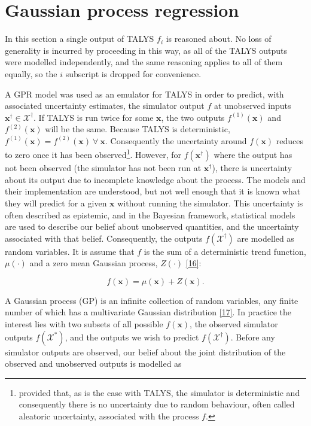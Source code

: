 \documentclass[
  12pt,
  a4paper,
  twoside]{book}
\begin{document}
\hypertarget{GPR:GPR}{%
\section{Gaussian process regression}\label{GPR:GPR}}

In this section a single output of TALYS \(f_i\) is reasoned about. No loss of generality is incurred by proceeding in this way, as all of the TALYS outputs were modelled independently, and the same reasoning applies to all of them equally, so the \(i\) subscript is dropped for convenience.

A GPR model was used as an emulator for TALYS in order to predict, with associated uncertainty estimates, the simulator output \(f\) at unobserved inputs \(\mathbf{x}^\dagger \in \mathcal{X}^\dagger\). If TALYS is run twice for some \(\mathbf{x}\), the two outputs \(f^{(1)}(\mathbf{x})\) and \(f^{(2)}(\mathbf{x})\) will be the same. Because TALYS is deterministic, \(f^{(1)}(\mathbf{x}) = f^{(2)}(\mathbf{x})~ \forall~ \mathbf{x}\). Consequently the uncertainty around \(f(\mathbf{x})\) reduces to zero once it has been observed\footnote{provided that, as is the case with TALYS, the simulator is deterministic and consequently there is no uncertainty due to random behaviour, often called aleatoric uncertainty, associated with the process \(f\).}. However, for \(f(\mathbf{x}^\dagger)\) where the output has not been observed (the simulator has not been run at \(\mathbf{x^\dagger}\)), there is uncertainty about its output due to incomplete knowledge about the process. The models and their implementation are understood, but not well enough that it is known what they will predict for a given \(\mathbf{x}\) without running the simulator. This uncertainty is often described as epistemic, and in the Bayesian framework, statistical models are used to describe our belief about unobserved quantities, and the uncertainty associated with that belief. Consequently, the outputs \(f(\mathcal{X^\dagger})\) are modelled as random variables. It is assume that \(f\) is the sum of a deterministic trend function, \(\mu(\mathbf{\cdot})\) and a zero mean Gaussian process, \(Z(\mathbf{\cdot})\) \protect\hyperlink{ref-dicekriging}{{[}16{]}}:

\begin{equation}
\label{eq:process}
f(\mathbf{x}) = \mu(\mathbf{x}) + Z(\mathbf{x}).
\end{equation}

A Gaussian process (GP) is an infinite collection of random variables, any finite number of which has a multivariate Gaussian distribution \protect\hyperlink{ref-gp4ml}{{[}17{]}}. In practice the interest lies with two subsets of all possible \(f(\mathbf{x})\), the observed simulator outputs \(f(\mathcal{X^*})\), and the outputs we wish to predict \(f(\mathcal{X^\dagger})\). Before any simulator outputs are observed, our belief about the joint distribution of the observed and unobserved outputs is modelled as
\end{document}
